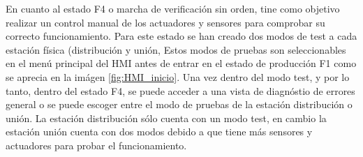 En cuanto al estado F4 o marcha de verificación sin orden, tine como objetivo realizar un control manual de los actuadores y sensores para comprobar su correcto funcionamiento. Para este estado se han creado dos modos de test a cada estación física (distribución y unión, Estos modos de pruebas son seleccionables en el menú principal del HMI antes de entrar en el estado de producción F1 como se aprecia en la imágen \ref{fig:HMI_inicio}. Una vez dentro del modo test, y por lo tanto, dentro del estado F4, se puede acceder a una vista de diagnóstio de errores general o  se puede escoger entre el modo de pruebas de la estación distribución o unión. La estación distribución sólo cuenta con un modo test, en cambio la estación unión cuenta con dos modos debido a que tiene más sensores y actuadores para probar el funcionamiento.

